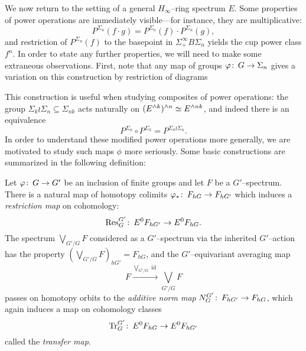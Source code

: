 We now return to the setting of a general \(H_\infty\)--ring spectrum \(E\).  Some properties of power operations are immediately visible---for instance, they are multiplicative: \[P^{\Sigma_n}(f \cdot g) = P^{\Sigma_n}(f) \cdot P^{\Sigma_n}(g),\] and restriction of \(P^{\Sigma_n}(f)\) to the basepoint in \(\Sigma^\infty_+ B\Sigma_n\) yields the cup power class \(f^n\).  In order to state any further properties, we will need to make some extraneous observations.  First, note that any map of groups \(\varphi\colon\thinspace G \to \Sigma_n\) gives a variation on this construction by restriction of diagrams
\begin{center}
\end{center}
This construction is useful when studying composites of power operations: the group \(\Sigma_k \wr \Sigma_n \subseteq \Sigma_{nk}\) acts naturally on \((E^{\wedge k})^{\wedge n} \simeq E^{\wedge nk}\), and indeed there is an equivalence \[P^{\Sigma_n} \circ P^{\Sigma_k} = P^{\Sigma_k \wr \Sigma_n}.\]  In order to understand these modified power operations more generally, we are motivated to study such maps \(\phi\) more seriously.  Some basic constructions are summarized in the following definition:
\begin{definition}\label{EquivariantDefns}
Let \(\varphi\colon\thinspace G \to G'\) be an inclusion of finite groups and let \(F\) be a \(G'\)--spectrum.  There is a natural map of homotopy colimits \(\varphi_*\colon\thinspace F_{hG} \to F_{hG'}\) which induces a \textit{restriction map} on cohomology: \[\mathrm{Res}_G^{G'}\colon\thinspace E^0 F_{hG'} \to E^0 F_{hG}.\]  The spectrum \(\bigvee_{G'/G} F\) considered as a \(G'\)--spectrum via the inherited \(G'\)--action has the property \((\bigvee_{G'/G} F)_{hG'} = F_{hG}\), and the \(G'\)--equivariant averaging map \[F \xrightarrow{\bigvee_{G'/G} \operatorname{id}} \bigvee_{G'/G} F\] passes on homotopy orbits to the \textit{additive norm map} \(N_G^{G'}\colon\thinspace F_{hG'} \to F_{hG}\), which again induces a map on cohomology classes \[\mathrm{Tr}_G^{G'}\colon\thinspace E^0 F_{hG} \to E^0 F_{hG'}\] called the \textit{transfer map}.
\end{definition}

